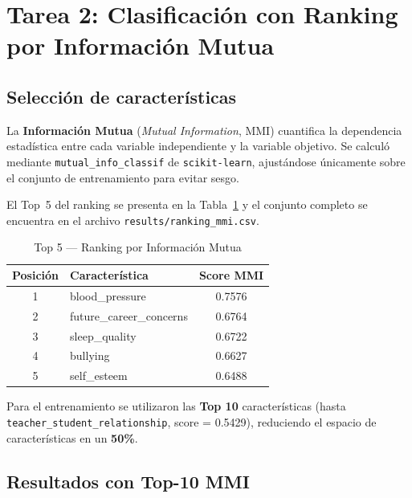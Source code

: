 \documentclass[12pt, letterpaper]{article}
\begin{document}
\section{Tarea 2: Clasificación con Ranking por Información Mutua}

\subsection{Selección de características}

La \textbf{Información Mutua} (\textit{Mutual Information}, MMI) cuantifica la
dependencia estadística entre cada variable independiente y la variable
objetivo. Se calculó mediante \texttt{mutual\_info\_classif} de
\texttt{scikit-learn}, ajustándose únicamente sobre el conjunto de
entrenamiento para evitar sesgo.

El Top~5 del ranking se presenta en la Tabla~\ref{tab:ranking_mmi} y el
conjunto completo se encuentra en el archivo \texttt{results/ranking\_mmi.csv}.

\begin{table}[H]
    \centering
    \caption{Top 5 — Ranking por Información Mutua}
    \label{tab:ranking_mmi}
    \begin{tabular}{clc}
        \toprule
        \textbf{Posición} & \textbf{Característica} & \textbf{Score MMI} \\
        \midrule
        \rowcolor{rowgray} 1 & blood\_pressure               & 0.7576 \\
        2                    & future\_career\_concerns      & 0.6764 \\
        \rowcolor{rowgray} 3 & sleep\_quality                & 0.6722 \\
        4                    & bullying                      & 0.6627 \\
        \rowcolor{rowgray} 5 & self\_esteem                  & 0.6488 \\
        \bottomrule
    \end{tabular}
\end{table}

Para el entrenamiento se utilizaron las \textbf{Top 10} características
(hasta \texttt{teacher\_student\_relationship}, score = 0.5429),
reduciendo el espacio de características en un \textbf{50\%}.

\subsection{Resultados con Top-10 MMI}
\end{document}
